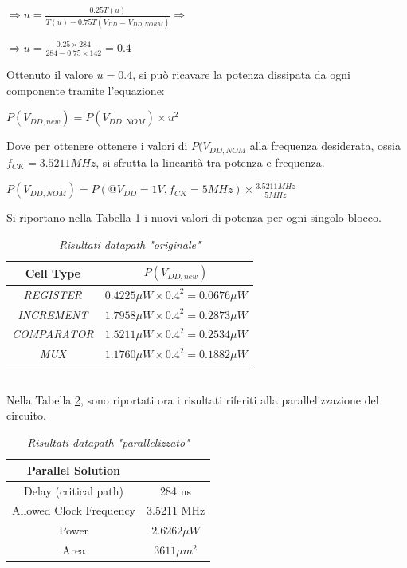 \begin{center}
		$\Longrightarrow u=\frac{0.25T(u)}{T(u)-0.75T(V_{DD}=V_{DD,NORM})}\Longrightarrow$
\end{center}
\begin{center}
	$\Longrightarrow u=\frac{0.25\times 284}{284-0.75 \times 142}=0.4$
\end{center}
Ottenuto il valore $u=0.4$, si può ricavare la potenza dissipata da ogni componente tramite l'equazione:
\begin{center}
   $P(V_{DD,new})=P(V_{DD, NOM})\times u^{2}$
\end{center}
Dove per ottenere ottenere i valori di $P(V_{DD, NOM}$ alla frequenza desiderata, ossia $f_{CK}=3.5211 MHz$, si sfrutta la linearità tra potenza e frequenza.
\begin{center}
	$P(V_{DD, NOM})=P(@V_ {DD}=1 V, f_{CK}=5MHz)\times \frac{3.5211 MHz}{5MHz}$
\end{center}
Si riportano nella Tabella \ref{Tab33_3} i nuovi valori di potenza per ogni singolo blocco.\\
\begin{table}[!h]\footnotesize
	\centering
	\begin{tabular}{|c|c|}
		\hline
		\textbf{Cell Type} & \textbf{$P(V_{DD, new})$} \\
		\hline
		\textit{REGISTER} & $0.4225 \mu W \times 0.4^{2}=0.0676 \mu W$\\
		\textit{INCREMENT} & $1.7958 \mu W \times 0.4^{2}=0.2873 \mu W$\\
		\textit{COMPARATOR} & $1.5211 \mu W \times 0.4^{2}=0.2534 \mu W$\\
		\textit{MUX} &$1.1760 \mu W \times 0.4^{2}=0.1882 \mu W$\\
		\hline
	\end{tabular}
	\caption{\textit{Risultati datapath "originale"}}
	\label{Tab33_3}
\end{table}
\\
Nella Tabella \ref{Tab33_4}, sono riportati ora i risultati riferiti alla parallelizzazione del circuito.
\begin{table}[!h]\footnotesize
	\centering
	\begin{tabular}{|c|c|}
		\hline
		\textbf{Parallel Solution} & \\
		\hline
		Delay (critical path) & 284 ns\\
		Allowed Clock Frequency & 3.5211 MHz\\
		Power & $2.6262\mu W$\\
		Area & $3611 \mu m^{2}$\\
		\hline
	\end{tabular}
	\caption{\textit{Risultati datapath "parallelizzato"}}
	\label{Tab33_4}
\end{table}\\
